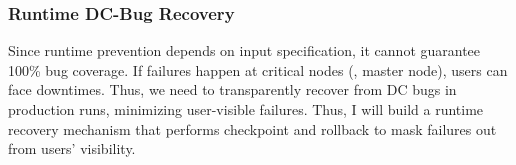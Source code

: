 \documentclass[11pt]{article}
\begin{document}
\subsubsection*{Runtime DC-Bug Recovery}

Since runtime prevention depends on input specification, it cannot guarantee
100\% bug coverage.  If failures happen at critical nodes (\eg, master node),
users can face downtimes. Thus, we need to transparently recover from DC bugs in
production runs, minimizing user-visible failures. Thus, I will build a runtime
recovery mechanism that performs checkpoint and rollback to mask failures out
from users' visibility.
\fi
\end{document}
